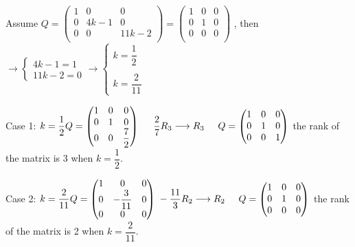 \documentclass[fleqn]{article}
\begin{document}
\begin{enumerate}
      \textcolor{hwColor}{
        Assume
        $
          Q=\begin{pmatrix}
          1 & 0 & 0 \\
          0 & 4k-1 & 0 \\
          0 & 0 & 11k-2 \\
        \end{pmatrix}=\begin{pmatrix}
          1 & 0 & 0 \\
          0 & 1 & 0 \\
          0 & 0 & 0 \\
        \end{pmatrix}
        $
        , then 
        $
         \longrightarrow
         \begin{cases}
           4k-1=1 \\
           11k-2=0  
         \end{cases}
         \longrightarrow
         \begin{cases}
           k=\dfrac{1}{2} \\
           \\
           k= \dfrac{2}{11} 
         \end{cases}
        $
      }

      \textcolor{hwColor}{
        Case 1: 
        $
           k=\dfrac{1}{2}
           \\
           Q=\begin{pmatrix}
             1 & 0 & 0 \\
             0 & 1 & 0 \\
             0 & 0 & \dfrac{7}{2}
           \end{pmatrix}
           \hspace{0.5cm} \dfrac{2}{7}R_3 \longrightarrow R_3
           \hspace{0.5cm} Q=\begin{pmatrix}
            1 & 0 & 0 \\
            0 & 1 & 0 \\
            0 & 0 & 1
           \end{pmatrix}
        $
        the rank of the matrix is 3 when $k=\dfrac{1}{2}$.
      }

      \bigbreak

      \textcolor{hwColor}{
        Case 2: 
        $
           k=\dfrac{2}{11}
           \\
           Q=\begin{pmatrix}
             1 & 0 & 0 \\
             0 & -\dfrac{3}{11} & 0 \\
             0 & 0 & 0
           \end{pmatrix}
           \hspace{0.1cm} -\dfrac{11}{3}R_2 \longrightarrow R_2
           \hspace{0.5cm} Q=\begin{pmatrix}
            1 & 0 & 0 \\
            0 & 1 & 0 \\
            0 & 0 & 0
           \end{pmatrix}
        $
        the rank of the matrix is 2 when $k=\dfrac{2}{11}$.
      }


\end{enumerate}
\end{document}
